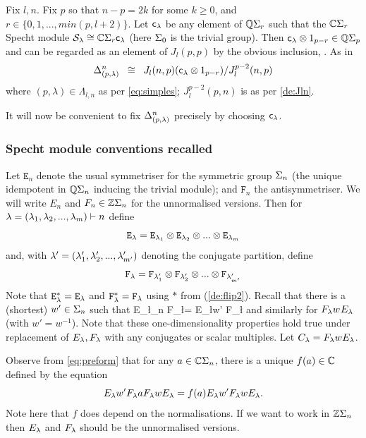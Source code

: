 \newcommand{\nE}{{\mathtt{E}}}  %
\newcommand{\nF}{{\mathtt{F}}}  %
\newcommand{\nC}{{\mathtt{C}}}  %
\newcommand{\cc}{{\mathsf{c}}}

Fix $l,n$. Fix $p$ so that $n-p=2k$ for some $k\geq 0$, and $r \in \{0, 1, ..., min(p,l+2)\}$. 
Let $\cc_\l$ be any element of ${\mathbb{Q}}\Sigma_{r}$ such that the 
$\mathbb{C}\Sigma_r$ Specht module $\SS_\l \cong \C\Sym_{r} \cc_\l$
(here $\Sigma_0$ is the trivial group). 
Then $\cc_\l \otimes 1_{p-r} \in \Q\Sym_p$ and can be regarded as an element of $J_l(p,p)$ by the obvious inclusion, 
. 
%
%
As in \cite{KadarYu}  %
\[
\Deltaa^{n}_{(p,\lambda)} \;\; \cong  \;\; J_l(n,p) ( \cc_\l \otimes 1_{p-r}) / J_l^{p-2}(n,p)
\]
where $(p,\lambda) \in\Lambda_{l,n}$ as per \ref{eq:simples}; 
$J_l^{p-2}(p,n)$ is as per \ref{de:Jln}.

It will now be convenient to fix $ \Delta^{n}_{(p,\lambda)}$  precisely by choosing $\cc_\l$. 


\subsubsection{Specht module conventions recalled}


\mdef \label{pa:Specht}
Let $\nE_n$ denote the usual symmetriser for the symmetric group $\Sigma_n$ (the unique idempotent in 
 ${\mathbb{Q}}\Sigma_n$ inducing the trivial module); 
and $\nF_n$ the antisymmetriser. 
We will write $E_n$ and $F_n \in \mathbb{Z}\Sigma_n$ for the unnormalised versions. 
Then for 
$\lambda = (\lambda_1 , \lambda_2, ..., \lambda_m) \vdash n$ define 
\[
\nE_\l = \nE_{\l_1} \otimes \nE_{\l_2} \otimes ... \otimes \nE_{\l_m}
\]
and, with 
$\lambda' = (\lambda_1' , \lambda_2' , ...,\lambda_{m'}')$ denoting the conjugate partition, define 
\[
\nF_\l = \nF_{\l'_1} \otimes \nF_{\l'_2} \otimes ... \otimes \nF_{\l'_{m'}}
\]
Note that $\nE_\l^* = \nE_\l$ and $\nF_\l^* = \nF_\l$ using $*$ from (\ref{de:flip2}). 
Recall that there is a (shortest) $w' \in \Sigma_n$ such that 
\beq  \label{eq:preform}  
E_\l \C \Sym_n  F_\l = \C E_\l w' F_\l
\eq 
and similarly for $F_\lambda w^{} E_\lambda$ (with $w' = w^{-1}$). 
Note that these one-dimensionality properties hold true under replacement of $E_\lambda , F_\lambda$ with any conjugates 
or scalar multiples. 
Let $C_\lambda =  F_\lambda w E_\lambda $. 

Observe from \eqref{eq:preform} that for any $a \in \mathbb{C} \Sigma_n$, there is a unique $f(a) \in \mathbb{C}$ defined by the equation
\[E_\lambda w' F_\lambda a F_\lambda w E_\lambda = f(a) E_\lambda w' F_\lambda w E_\lambda.\]
Note here that $f$ does depend on the normalisations. %
If we want to work in $\mathbb{Z}\Sigma_n$ then $E_\lambda$ and $F_\lambda$ should be the unnormalised versions. 

